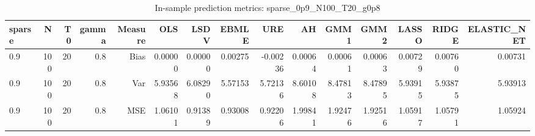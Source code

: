 \begin{table}[!htbp]\centering
\caption{In-sample prediction metrics: sparse_0p9_N100_T20_g0p8}
\label{tab:table2_sparse_0p9_N100_T20_g0p8}
\begin{tabular}{lrrrrrrrrrrrrrr}
\hline
sparse & N & T0 & gamma & Measure & OLS & LSDV & EBMLE & URE & AH & GMM1 & GMM2 & LASSO & RIDGE & ELASTIC_NET \\
\hline
0.9 & 100 & 20 & 0.8 & Bias & 0.00000 & 0.00000 & 0.00275 & -0.00236 & 0.00064 & 0.00061 & 0.00063 & 0.00729 & 0.00760 & 0.00731 \\
0.9 & 100 & 20 & 0.8 & Var & 5.93568 & 6.08290 & 5.57153 & 5.72136 & 8.60108 & 8.47813 & 8.47895 & 5.93915 & 5.93875 & 5.93913 \\
0.9 & 100 & 20 & 0.8 & MSE & 1.06101 & 0.91389 & 0.93008 & 0.92206 & 1.99841 & 1.92476 & 1.92516 & 1.05917 & 1.05791 & 1.05924 \\
\hline
\end{tabular}
\end{table}

